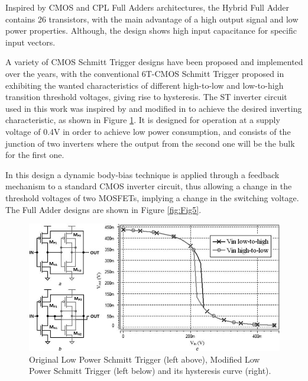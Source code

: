 \documentclass[ecp,tc, english]{iiufrgs}
\begin{document}
Inspired by CMOS and CPL Full Adders architectures, the Hybrid Full Adder \cite{navi2009novel} contains 26 transistors, with the main advantage of a high output signal and low power properties. Although, the design shows high input capacitance for specific input vectors.

A variety of CMOS Schmitt Trigger designs have been proposed and implemented over the years, with the conventional 6T-CMOS Schmitt Trigger proposed in \cite{doki1984cmos} exhibiting the wanted characteristics of different high-to-low and low-to-high transition threshold voltages, giving rise to hysteresis. The ST inverter circuit used in this work was inspired by \cite{zhang2003low} and modified in \cite{dokania2015circuit} to achieve the desired inverting characteristic, as shown in Figure \ref{fig:Fig4}. It is designed for operation at a supply voltage of 0.4V in order to achieve low power consumption, and consists of the junction of two inverters where the output from the second one will be the bulk for the first one.  

In this design a dynamic body-bias technique is applied through a feedback mechanism to a standard CMOS inverter circuit, thus allowing a change in the threshold voltages of two MOSFETs, implying a change in the switching voltage. The Full Adder designs are shown in Figure \ref{fig:Fig5}.

\begin{figure}[ht]
\centering
\includegraphics[width=1\textwidth]{lpSchmitt.jpg}
\caption{Original Low Power Schmitt Trigger (left above), Modified Low Power Schmitt Trigger (left below) and its hysteresis curve (right).}
\label{fig:Fig4}
\end{figure}
\end{document}
